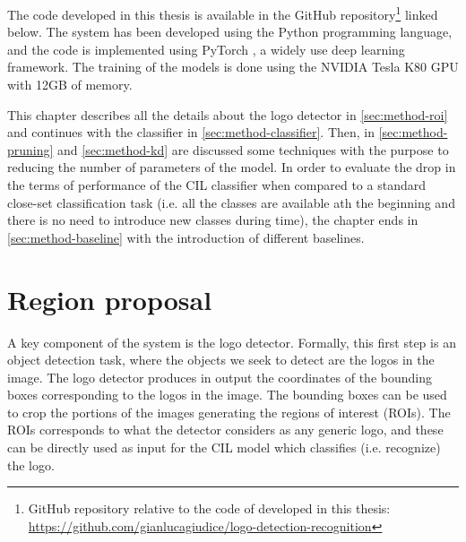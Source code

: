 The code developed in this thesis is available in the GitHub repository\footnote{GitHub repository relative to the code of developed in this thesis: \\ \href{https://github.com/gianlucagiudice/logo-detection-recognition}{https://github.com/gianlucagiudice/logo-detection-recognition}} linked below. The system has been developed using the Python programming language, and the code is implemented using PyTorch \cite{paszke2019pytorch}, a widely use deep learning framework. The training of the models is done using the NVIDIA Tesla K80 GPU with 12GB of memory.


\vspace{1.5\baselineskip}
This chapter describes all the details about the logo detector in \autoref{sec:method-roi} and continues with the classifier in \autoref{sec:method-classifier}. Then, in \autoref{sec:method-pruning} and \autoref{sec:method-kd} are discussed some techniques with the purpose to reducing the number of parameters of the model. In order to evaluate the drop in the terms of performance of the CIL classifier when compared to a standard close-set classification task (i.e. all the classes are available ath the beginning and there is no need to introduce new classes during time),
the chapter ends in \autoref{sec:method-baseline} with the introduction of different baselines.

\section{Region proposal}
A key component of the system is the logo detector. Formally, this first step is an object detection task, where the objects we seek to detect are the logos in the image. The logo detector produces in output the coordinates of the bounding boxes corresponding to the logos in the image. The bounding boxes can be used to crop the portions of the images generating the regions of interest (ROIs). The ROIs corresponds to what the detector considers as any generic logo, and these can be directly used as input for the CIL model which classifies (i.e. recognize) the logo.


\label{sec:method-roi}
